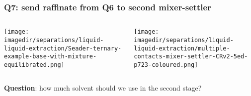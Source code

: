 \begin{frame}\frametitle{Q7: send raffinate from Q6 to second mixer-settler}

	\begin{columns}[t]
			\begin{center}
				\texttt{[image: \\imagedir/separations/liquid-liquid-extraction/Seader-ternary-example-base-with-mixture-equilibrated.png]}
			\end{center}
			\begin{center}
				\hspace{-3cm}
				\vspace{24pt}
				\texttt{[image: \\imagedir/separations/liquid-liquid-extraction/multiple-contacts-mixer-settler-CRv2-5ed-p723-coloured.png]}
			\end{center}
	\end{columns}
	\vspace{12pt}
	\textbf{Question}: how much solvent should we use in the second stage?
\end{frame}

